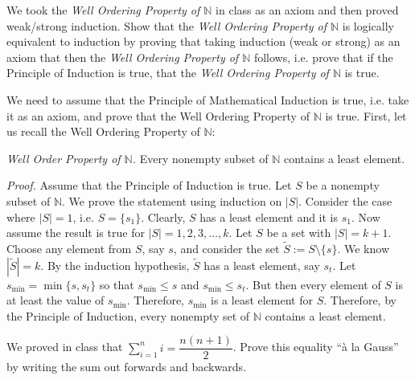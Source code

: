 \documentclass[11pt,letterpaper]{article}
\begin{document}
\newpage



 We took the \textit{Well Ordering Property of $\mathbb{N}$} in class as an axiom and then proved weak/strong induction. Show that the \textit{Well Ordering Property of $\mathbb{N}$} is logically equivalent to induction by proving that taking induction (weak or strong) as an axiom that then the \textit{Well Ordering Property of $\mathbb{N}$} follows, i.e. prove that if the Principle of Induction is true, that the \textit{Well Ordering Property of $\mathbb{N}$} is true. \pspace

\sol We need to assume that the Principle of Mathematical Induction is true, i.e. take it as an axiom, and prove that the Well Ordering Property of $\mathbb{N}$ is true. First, let us recall the Well Ordering Property of $\mathbb{N}$: \pspace

{\itshape Well Order Property of $\mathbb{N}$.} Every nonempty subset of $\mathbb{N}$ contains a least element. \pspace

{\itshape Proof.} Assume that the Principle of Induction is true. Let $S$ be a nonempty subset of $\mathbb{N}$. We prove the statement using induction on $|S|$. Consider the case where $|S|= 1$, i.e. $S= \{ s_1 \}$. Clearly, $S$ has a least element and it is $s_1$. Now assume the result is true for $|S|= 1, 2, 3, \ldots, k$. Let $S$ be a set with $|S|= k + 1$. Choose any element from $S$, say $s$, and consider the set $\widetilde{S}:= S \setminus \{ s \}$. We know $|\widetilde{S}|= k$. By the induction hypothesis, $\widetilde{S}$ has a least element, say $s_t$. Let $s_{\text{min}}= \min \{ s, s_t \}$ so that $s_{\text{min}} \leq s$ and $s_{\text{min}} \leq s_t$. But then every element of $S$ is at least the value of $s_{\text{min}}$. Therefore, $s_{\text{min}}$ is a least element for $S$. Therefore, by the Principle of Induction, every nonempty set of $\mathbb{N}$ contains a least element. 



\newpage



 We proved in class that $\displaystyle \sum_{i=1}^n i= \dfrac{n(n + 1)}{2}$. Prove this equality ``\`a la Gauss'' by writing the sum out forwards and backwards. \pspace
\end{document}
